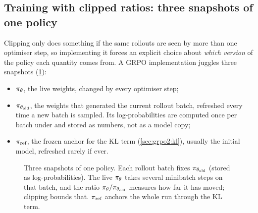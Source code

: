 \subsection{Training with clipped ratios: three snapshots of one policy}\label{sec:grpo2:clipstrain}

Clipping only does something if the same rollouts are seen by more than one optimiser step,
so implementing it forces an explicit choice about \emph{which version} of the policy each
quantity comes from. A GRPO implementation juggles three snapshots (\cref{fig:grpo2:snapshots}):
\begin{itemize}
\item $\pi_\theta$, the live weights, changed by every optimiser step;
\item $\pi_{\theta_{\text{old}}}$, the weights that generated the current rollout batch, refreshed every time a
new batch is sampled. Its log-probabilities are computed once per batch under 
and stored as numbers, not as a model copy;
\item $\pi_{\text{ref}}$, the frozen anchor for the KL term (\cref{sec:grpo2:kl}), usually the
initial model, refreshed rarely if ever.
\end{itemize}

\begin{figure}[ht]
\centering
{}
\caption{Three snapshots of one policy. Each rollout batch fixes $\pi_{\theta_{\text{old}}}$ (stored as
log-probabilities). The live $\pi_\theta$ takes several minibatch steps on that batch, and the
ratio $\pi_\theta/\pi_{\theta_{\text{old}}}$ measures how far it has moved; clipping bounds that. $\pi_{\text{ref}}$
anchors the whole run through the KL term.}
\label{fig:grpo2:snapshots}
\end{figure}

